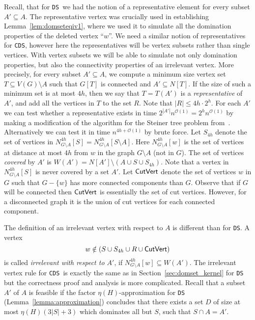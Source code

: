 \documentclass[11pt]{article}
\newcommand{\tDS}{{\texttt{\sc DS}}}
\newcommand{\tCDS}{{\texttt{\sc CDS}}}
\newcommand{\cO}{\mathcal{O}}
\begin{document}
Recall, that for \tDS \, we had the notion of a representative element for every subset $A'\subseteq A$. The representative vertex was crucially used in establishing  Lemma~\ref{lem:domseteqiv1}, where we used it to simulate all the domination properties of the deleted vertex ``$w$''.  We need a similar notion of representatives for \tCDS, however here the representatives will be vertex subsets rather than single vertices. With vertex subsets we will be able to simulate not only   domination properties, but also the connectivity properties of an  irrelevant vertex. More precisely, for every subset $A' \subseteq A$, we compute a minimum size vertex set $T \subseteq V(G)\setminus A$ such that $G[T]$ is connected and $A' \subseteq N[T]$. If the size of such a minimum set is at most $4h$, then we say that $T=T(A')$ is a {\em representative} of $A'$, and add all the vertices in $T$ to the set $R$. Note that $|R| \leq 4h \cdot 2^h$.
For each   $A'$ we can test whether a representative exists in time $2^{|A'|}n^{\cO(1)}=2^hn^{\cO(1)}$ by making a modification of the algorithm for the  Steiner tree problem from~\cite{BjorklundHKK07}. Alternatively we can test it in time $n^{4h+\cO(1)}$ by brute force. Let $S_{4h}$ denote the set of vertices in 
$N_{G\setminus A}^{4h}[S]=N_{G\setminus A}^{4h}[S\setminus A]$. Here $N_{G\setminus A}^{4h}[w]$ is the set of vertices at distance at most $4h$ from $w$ in the graph $G\setminus A$ (not in $G$). 
The set of vertices \emph{covered} by $A'$ is $W(A') = N[A']\setminus (A \cup S \cup  S_{4h})$. Note that a vertex in $N_{G\setminus A}^{4h}[S]$ is never covered by a set $A'$.  Let ${\sf CutVert}$ denote the set of vertices  $w$ in $G$ such that $G-\{w\}$ has more connected components than $G$. Observe that if $G$ will be connected  then ${\sf CutVert}$ is essentially the set of cut vertices. However, for a disconnected graph it is the union of cut vertices for each connected component. 

The definition of an irrelevant vertex with respect to $A$ is   different than for \tDS{}. A vertex
 \[ w\notin (S\cup S_{4h} \cup R \cup {\sf CutVert})\]
  is called {\em irrelevant with respect to $A'$}, if $N_{G\setminus A}^{4h}[w] \subseteq W(A')$.  The irrelevant vertex rule for \tCDS \, is exactly the same as in Section~\ref{sec:domset_kernel} for \tDS \, but the correctness proof and analysis is more complicated. Recall that a subset $A'$ of $A$ is feasible if the factor $\eta(H)$-approximation for \tDS{} (Lemma~\ref{lemma:approximation})  concludes that there exists a set $D$ of size 
at most $\eta(H)(3|S|+3)$ which dominates all but $S$, such that $S \cap A = A'$.
\end{document}
